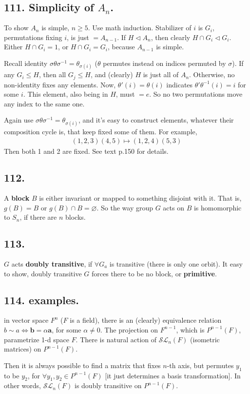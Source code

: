 \documentclass[12pt]{article}
\newcommand\aG\alpha \newcommand\bG\beta  \newcommand\gG\gamma \newcommand\dG\delta \newcommand\eG\varepsilon \newcommand\zG\zeta \newcommand\tG\theta \newcommand\kG\kappa \newcommand\lG\lambda \newcommand\sG\sigma \newcommand\fG\varphi \newcommand\oG\omega
\newcommand\V\boldsymbol%
\newcommand\Ev\forall%
\newcommand\Mp\mapsto%
\newcommand{\Eq}{\Leftrightarrow}%
\newcommand{\CF}[1]{ \mathcal{#1} }%
\newcommand{\Ss}[1]{\textsf{\textbf{#1}}}%
\newcommand{\EqGo}[1]{ \begin{gather*}{#1}\end{gather*} } %
\begin{document}
\subsection*{111. Simplicity of \(A_n\).} To show \(A_n\) is simple, \(n \geq 5\). 
Use math induction. 
Stabilizer of \(i\) is \(G_i\), permutations fixing \(i\), is just \(= A_{n-1}\). 
If \(H \lhd A_n\), then clearly \(H \cap G_i \lhd G_i\). 
Either \(H \cap G_i =1\), or \(H \cap G_i = G_i\), because \(A_{n-1}\) is simple. \par
Recall identity \(\sG \tG \sG^{-1} = \tG_{\sG(i)}\) (\(\tG\) permutes instead on indices permuted by \(\sG\)). 
If any \(G_i \leq H\), then all \(G_j \leq H\), and (clearly) \(H\) is just all of \(A_n\). 
Otherwise, no non-identity fixes any elements. 
Now, \(\tG'(i)=\tG(i)\) indicates \(\tG'\tG^{-1}(i)=i\) for some \(i\). 
This element, also being in \(H\), must \(=e\). 
So no two permutations move any index to the same one. \par
Again use \(\sG \tG \sG^{-1} = \tG_{\sG(i)}\), and it's easy to construct elements, whatever their composition cycle is, that keep fixed some of them. For example, \EqGo{
 (1,2,3)(4,5) \Mp (1,2,4)(5,3)
} Then both 1 and 2 are fixed. See text p.150 for details. 

\subsection*{112.} A \Ss{block} \(B\) is either invariant or mapped to something disjoint with it. 
That is, \(g(B)=B\) or \(g(B) \cap B = \varnothing\). 
So the way group \(G\) acts on \(B\) is homomorphic to \(S_n\), if there are \(n\) blocks. 

\subsection*{113.} \(G\) acts \Ss{doubly transitive}, if \(\Ev G_a\) is transitive (there is only one orbit). 
It easy to show, doubly transitive \(G\) forces there to be no block, or \Ss{primitive}. 

\subsection*{114. examples.} in vector space \(F^n\) (\(F\) is a field), there is an (clearly) equivalence relation \(b \sim a \Eq \V{b} = \aG \V{a}\), for some \(\aG \neq 0\). 
The projection on \(F^{n-1}\), which is \(P^{n-1}(F)\), parametrize 1-d space \(F\). 
There is natural action of \(\CF{SL}_n(F)\) (isometric matrices) on \(P^{n-1}(F)\). \par
Then it is always possible to find a matrix that fixes \(n\)-th axis, but permutes \(y_1\) to be \(y_2\), for \(\Ev y_1, y_2 \in P^{n-1}(F)\) [it just determines a basis transformation]. 
In other words, \(\CF{SL}_n(F)\) is doubly transitive on \(P^{n-1}(F)\). 
\end{document}
